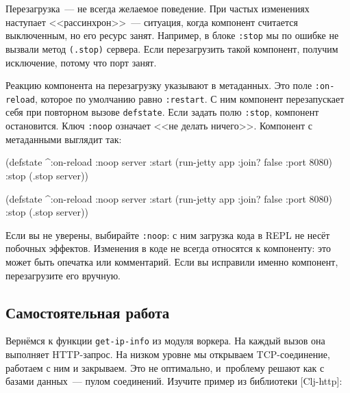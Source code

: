 Перезагрузка~--- не всегда желаемое поведение. При частых изменениях наступает
<<рассинхрон>>~--- ситуация, когда компонент считается выключенным, но его
ресурс занят. Например, в блоке \verb|:stop| мы по ошибке не вызвали метод
\verb|(.stop)| сервера. Если перезагрузить такой компонент, получим исключение,
потому что порт занят.

Реакцию компонента на перезагрузку указывают в метаданных. Это поле
\verb|:on-reload|, которое по умолчанию равно \verb|:restart|. С ним компонент
перезапускает себя при повторном вызове \verb|defstate|. Если задать полю
\verb|:stop|, компонент остановится. Ключ \verb|:noop| означает <<не делать
ничего>>. Компонент с метаданными выглядит так:

\pagebreaklarge

\ifnarrow

\begin{english}
  \begin{clojure}
(defstate
  ^{:on-reload :noop}
  server
  :start (run-jetty app
           {:join? false :port 8080})
  :stop (.stop server))
  \end{clojure}
\end{english}

\else

\begin{english}
  \begin{clojure}
(defstate
  ^{:on-reload :noop}
  server
  :start (run-jetty app {:join? false :port 8080})
  :stop (.stop server))
  \end{clojure}
\end{english}

\fi

Если вы не уверены, выбирайте \verb|:noop|: с ним загрузка кода в REPL не несёт
побочных эффектов. Изменения в коде не всегда относятся к компоненту: это может
быть опечатка или комментарий. Если вы исправили именно компонент, перезагрузите
его вручную.

\subsection{Самостоятельная работа}


Вернёмся к функции \verb|get-ip-info| из модуля воркера. На каждый вызов она
выполняет HTTP-запрос. На низком уровне мы открываем TCP-соединение, работаем с
ним и закрываем. Это не оптимально, и~проблему решают как с базами данных~---
пулом соединений. Изучите пример из библиотеки
[Clj-http]:

